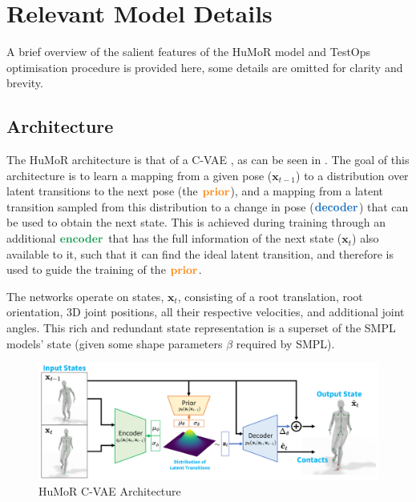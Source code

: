 \section{Relevant Model Details}

A brief overview of the salient features of the HuMoR model and TestOps optimisation procedure is provided here, some details are omitted for clarity and brevity.

\subsection{Architecture}
The HuMoR architecture is that of a C-VAE \cite{CVAE}, as can be seen in . The goal of this architecture is to learn a mapping from a given pose ($\mathbf{x}_{t-1}$) to a distribution over latent transitions to the next pose (the $\textbf{\textcolor{orange}{prior}}$), and a mapping from a latent transition sampled from this distribution to a change in pose ($\textbf{\textcolor{RoyalBlue}{decoder}}$) that can be used to obtain the next state. This is achieved during training through an additional $\textbf{\textcolor{ForestGreen}{encoder}}$ that has the full information of the next state ($\textbf{x}_t$) also available to it, such that it can find the ideal latent transition, and therefore is used to guide the training of the $\textbf{\textcolor{orange}{prior}}$.

The networks operate on states, $\mathbf{x}_t$, consisting of a root translation, root orientation, 3D joint positions, all their respective velocities, and additional joint angles. This rich and redundant state representation is a superset of the SMPL models' state \cite{SMPL} (given some shape parameters $\beta$ required by SMPL).

\begin{figure}[!ht]
    \centering
    \includegraphics[width=1\textwidth]{Figures/humor/model/architecture.png}
    \caption{HuMoR C-VAE Architecture \cite{humor}}
    \label{fig:humor_architecture}
\end{figure}


